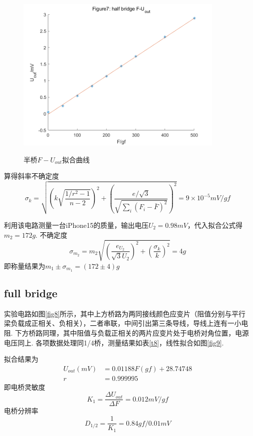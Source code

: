 \documentclass[12pt, a4paper]{ctexart}
\begin{document}
\begin{figure}[htbp]
    \centering
    \caption{半桥$F-U_{out}$拟合曲线}
    \includegraphics[width=4in]{figure/half bridge F-U_out.png}
    \label{fig7}
\end{figure}

算得斜率不确定度
\begin{equation*}
    \sigma_k = \sqrt{(k\sqrt{\frac{1/r^2-1}{n-2}})^2 + (\frac{e/\sqrt{3}}{\sqrt{\sum_i (F_i - \bar{F})^2}})^2} = 9 \times 10^{-5}mV/gf
\end{equation*}

利用该电路测量一台iPhone15的质量，输出电压$U_2 = 0.98mV$，代入拟合公式得$m_2 = 172g$.
不确定度
\begin{equation*}
    \sigma_{m_2} = m_2 \sqrt{(\frac{e_{U_2}}{\sqrt{3}U_2})^2 + (\frac{\sigma_k}{k})^2} = 4g
\end{equation*}
即称量结果为$m_1 \pm \sigma_{m_1} = (172 \pm 4)g$

\subsection{full bridge}

实验电路如图\ref{fig8}所示，其中上方桥路为两同接线颜色应变片（阻值分别与平行梁负载成正相关、负相关），二者串联，中间引出第三条导线，导线上连有一小电阻.
下方桥路同理，其中阻值与负载正相关的两片应变片处于电桥对角位置，电源电压同上.
各项数据处理同1/4桥，测量结果如表\ref{t8}，线性拟合如图\ref{fig9}.

拟合结果为
\begin{align*}
    U_{out}(mV) &= 0.01188F(gf) + 28.74748 \\
    r &= 0.999995
\end{align*}
即电桥灵敏度
\begin{equation*}
    K_{1} = \frac{\Delta U_{out}}{\Delta F} = 0.012mV/gf
\end{equation*}
电桥分辨率
\begin{equation*}
    D_{1/2} = \frac{1}{K_{1}} = 0.84gf/0.01mV
\end{equation*}
\end{document}
